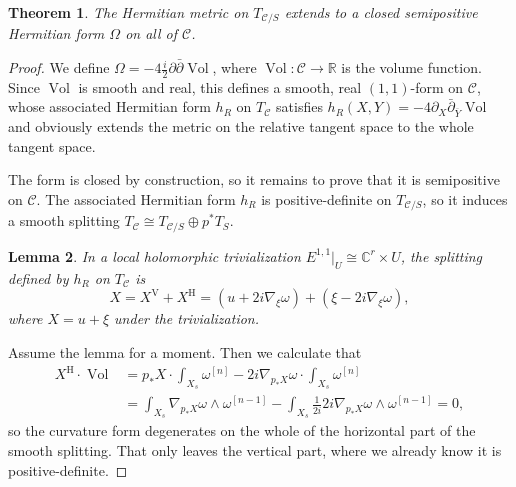 \documentclass[11pt,a4paper]{amsart}
\newtheorem{theo}{Theorem}[section]
\newtheorem{lemm}[theo]{Lemma}
\theoremstyle{definition}
\theoremstyle{remark}
\newcommand{\RR}{\mathbb{R}}
\newcommand{\CC}{\mathbb{C}}
\newcommand{\Vol}{\mathop{\mathrm{Vol}}}
\def\ov#1{\overline{#1}}
\def\dbar{\bar\partial}
\def\conn{\nabla}
\def\kf{\omega}
\def\kcForm{\Omega}
\def\kcHerm{h_R}
\def\ton{u}
\def\^#1{^{[#1]}}
\def\KC{C}
\def\RKC{\mathcal{\KC}}
\begin{document}
\begin{theo}
The Hermitian metric on $T_{\RKC/S}$ extends to a closed semipositive
Hermitian form $\kcForm$ on all of $\RKC$.
\end{theo}


\begin{proof}
We define $\kcForm = -4 \frac{i}{2}\partial\dbar \Vol$, where
$\Vol : \RKC \to \RR$ is the volume function. Since $\Vol$ is
smooth and real, this defines a smooth, real $(1,1)$-form on
$\RKC$, whose associated Hermitian form $\kcHerm$ on $T_{\RKC}$
satisfies $\kcHerm(X, Y) = -4\partial_{X} \dbar_{\ov{Y}} \Vol$ and
obviously extends the metric on the relative tangent space to the whole
tangent space.

The form is closed by construction, so it remains to prove that it is
semipositive on $\RKC$.  The associated Hermitian form $\kcHerm$ is
positive-definite on $T_{\RKC/S}$, so it induces a smooth splitting
$T_{\RKC} \cong T_{\RKC/S} \oplus p^*T_S$. 

\begin{lemm}
\label{lemm:orthogonal.split}
In a local holomorphic trivialization $E^{1,1}|_U \cong \CC^r \times U$,
the splitting defined by $\kcHerm$ on $T_{\RKC}$ is 
$$
X 
= X^{\mathrm{V}} + X^{\mathrm{H}}
= (\ton + 2i \conn_{\xi}\kf)
+ (\xi - 2i \conn_{\xi}\kf),
$$
where $X = \ton + \xi$ under the trivialization.
\end{lemm}

Assume the lemma for a moment. Then we calculate that
\begin{align*}
X^{\mathrm{H}} \cdot \Vol
&= p_*X \cdot \int_{X_s} \kf\^n
- 2i\conn_{p_*X}\kf \cdot \int_{X_s} \kf\^n
\\
&= \int_{X_s} \conn_{p_*X}\kf \wedge \kf\^{n-1}
- \int_{X_s} \frac{1}{2i} 2i \conn_{p_*X}\kf \wedge \kf\^{n-1}
= 0,
\end{align*}
so the curvature form degenerates on the whole of the horizontal part of
the smooth splitting. That only leaves the vertical part, where we
already know it is positive-definite.
\end{proof}
\end{document}
